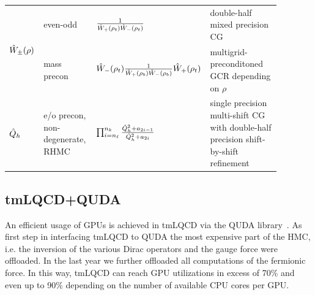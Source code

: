 \documentclass[a0,portrait]{a0poster}
\begin{document}
\begin{multicols}{2}
    \begin{tabular}{p{0.08\linewidth}p{0.2\linewidth}p{0.3\linewidth}p{0.3\linewidth}}
    \multirow{2}{*}{$\hat{W}_\pm(\rho)$} & even-odd & \centering $\frac{1}{\hat{W}_{+}(\rho_t) \hat{W}_{-}(\rho_t)}$ & double-half mixed precision CG \\
      & mass precon & \centering $\hat{W}_{-}(\rho_t) \frac{1}{\hat{W}_{+}(\rho_b) \hat{W}_{-}(\rho_b)} \hat{W}_{+}(\rho_t)$ & multigrid-preconditoned GCR depending on $\rho$ \\
      $\hat{Q}_h$ & e/o precon, non-degenerate, RHMC & \centering $\prod_{i=n_\ell}^{n_k} \frac{ \hat{Q}^2_h + a_{2i-1} }{ \hat{Q}^2_h + a_{2i} }$ & single precision multi-shift CG with double-half precision shift-by-shift refinement
    \end{tabular}

    \subsection*{tmLQCD+QUDA}

    An efficient usage of GPUs is achieved in tmLQCD via the QUDA library~\cite{Clark:2009wm,Babich:2011np}. As first step in interfacing tmLQCD to QUDA \cite{Kostrzewa:2022hsv} the most expensive part of the HMC, i.e. the inversion of the various Dirac operators and the gauge force were offloaded. In the last year we further offloaded all computations of the fermionic force. In this way, tmLQCD can reach GPU utilizations in excess of 70\% and even up to 90\% depending on the number of available CPU cores per GPU.


\end{multicols}
\end{document}
